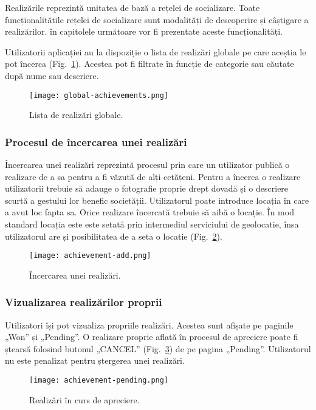     Realizările reprezintă unitatea de bază a rețelei de socializare. Toate funcționalitătile rețelei de socializare sunt modalități de 
    descoperire și câștigare a realizărilor. în capitolele următoare vor fi prezentate aceste funcționalități.
    
    Utilizatorii aplicației au la dispoziție o lista de realizări globale pe care aceștia le pot încerca (Fig.~\ref{fig:global-achievements}). 
    Acestea pot fi filtrate în funcție de categorie sau căutate după nume sau descriere. 
    \begin{figure}[h]
    \texttt{[image: global-achievements.png]}
    \centering
    \caption{Lista de realizări globale.}
    \label{fig:global-achievements}
    \end{figure}
\subsubsection{Procesul de încercarea unei realizări}

    Încercarea unei realizări reprezintă procesul prin care un utilizator publică o realizare de a sa 
    pentru a fi văzută de alți cetățeni. Pentru a încerca o realizare utilizatorii trebuie să adauge o fotografie 
    proprie drept dovadă și o descriere scurtă a gestului lor benefic societății.
    Utilizatorul poate introduce locația în care a avut loc fapta sa. Orice realizare încercată trebuie să aibă o locație. 
    În mod standard locația este este setată prin intermediul serviciului de geolocatie, însa utilizatorul 
    are și posibilitatea de a seta o locatie (Fig.~\ref{fig:achievement-add}).

    \begin{figure}[h]
    \texttt{[image: achievement-add.png]}
    \centering
    \caption{Încercarea unei realizări.}
    \label{fig:achievement-add}
    \end{figure} 
\clearpage
\subsubsection{Vizualizarea realizărilor proprii}

    Utilizatori își pot vizualiza propriile realizări. Acestea sunt afișate pe paginile „Won” și „Pending”.
    O realizare proprie aflată în procesul de apreciere poate fi ștearsă folosind butonul „CANCEL” (Fig.~\ref{fig:achievement-pending}) de pe pagina 
    „Pending”. Utilizatorul nu este penalizat pentru ștergerea unei realizări.
    \begin{figure}[h]
    \texttt{[image: achievement-pending.png]}
    \centering
    \caption{Realizări în curs de apreciere.}
    \label{fig:achievement-pending}
    \end{figure} 

